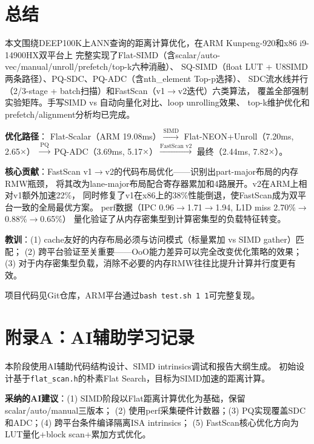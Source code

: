 \documentclass[11pt,a4paper]{article}
\begin{document}
\section{总结}

本文围绕DEEP100K上ANN查询的距离计算优化，在ARM Kunpeng-920和x86 i9-14900HX双平台上
完整实现了Flat-SIMD（含scalar/auto-vec/manual/unroll/prefetch/top-k六种消融）、
SQ-SIMD（float LUT + U8SIMD两条路径）、PQ-SDC、PQ-ADC（含nth\_element Top-p选择）、
SDC流水线并行（2/3-stage + batch扫描）和FastScan（v1$\to$v2迭代）六类算法，
覆盖全部强制实验矩阵。手写SIMD vs 自动向量化对比、loop unrolling效果、
top-k维护优化和prefetch/alignment分析均已完成。

\textbf{优化路径}：
Flat-Scalar（ARM 19.08ms）$\xrightarrow{\text{SIMD}}$ Flat-NEON+Unroll（7.20ms, 2.65$\times$）
$\xrightarrow{\text{PQ}}$ PQ-ADC（3.69ms, 5.17$\times$）$\xrightarrow{\text{FastScan v2}}$ 最终（2.44ms, 7.82$\times$）。

\textbf{核心贡献}：FastScan v1$\to$v2的代码布局优化——识别出part-major布局的内存RMW瓶颈，
将其改为lane-major布局配合寄存器累加和4路展开。v2在ARM上相对v1额外加速22\%，
同时修复了v1在x86上的38\%性能倒退，使FastScan成为双平台一致的全局最优方案。
perf数据（IPC 0.96$\to$1.71$\to$1.94, L1D miss 2.70\%$\to$0.88\%$\to$0.65\%）
量化验证了从内存密集型到计算密集型的负载特征转变。

\textbf{教训}：(1) cache友好的内存布局必须与访问模式（标量累加 vs SIMD gather）匹配；
(2) 跨平台验证至关重要——OoO能力差异可以完全改变优化策略的效果；
(3) 对于内存密集型负载，消除不必要的内存RMW往往比提升计算并行度更有效。

项目代码见Git仓库，ARM平台通过\texttt{bash test.sh 1 1}可完整复现。

\appendix
\section{附录A：AI辅助学习记录}

本阶段使用AI辅助代码结构设计、SIMD intrinsics调试和报告大纲生成。
初始设计基于\texttt{flat\_scan.h}的朴素Flat Search，目标为SIMD加速的距离计算。

\textbf{采纳的AI建议}：(1) SIMD阶段以Flat距离计算优化为基础，保留scalar/auto/manual三版本；
(2) 使用perf采集硬件计数器；(3) PQ实现覆盖SDC和ADC；(4) 跨平台条件编译隔离ISA intrinsics；
(5) FastScan核心优化方向为LUT量化+block scan+累加方式优化。
\end{document}
